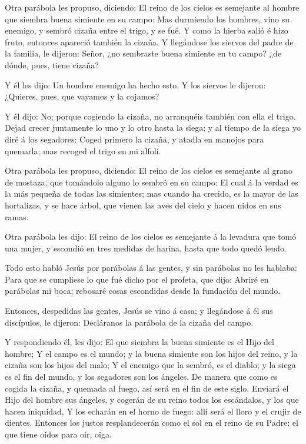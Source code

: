  Otra parábola les propuso, diciendo: El reino de los
cielos es semejante al hombre que siembra buena simiente en su campo:
 Mas durmiendo los hombres, vino su enemigo, y sembró
cizaña entre el trigo, y se fué.  Y como la hierba salió é
hizo fruto, entonces apareció también la cizaña.  Y
llegándose los siervos del padre de la familia, le dijeron: Señor, ¿no
sembraste buena simiente en tu campo? ¿de dónde, pues, tiene cizaña?

 Y él les dijo: Un hombre enemigo ha hecho esto. Y los
siervos le dijeron: ¿Quieres, pues, que vayamos y la cojamos?

 Y él dijo: No; porque cogiendo la cizaña, no arranquéis
también con ella el trigo.  Dejad crecer juntamente lo uno
y lo otro hasta la siega; y al tiempo de la siega yo diré á los
segadores: Coged primero la cizaña, y atadla en manojos para quemarla;
mas recoged el trigo en mi alfolí.

 Otra parábola les propuso, diciendo: El reino de los
cielos es semejante al grano de mostaza, que tomándolo alguno lo sembró
en su campo:  El cual á la verdad es la más pequeña de
todas las simientes; mas cuando ha crecido, es la mayor de las
hortalizas, y se hace árbol, que vienen las aves del cielo y hacen nidos
en sus ramas.

 Otra parábola les dijo: El reino de los cielos es
semejante á la levadura que tomó una mujer, y escondió en tres medidas
de harina, hasta que todo quedó leudo.

 Todo esto habló Jesús por parábolas á las gentes, y sin
parábolas no les hablaba:  Para que se cumpliese lo que fué
dicho por el profeta, que dijo: Abriré en parábolas mi boca; rebosaré
cosas escondidas desde la fundación del mundo.

 Entonces, despedidas las gentes, Jesús se vino á casa; y
llegándose á él sus discípulos, le dijeron: Decláranos la parábola de la
cizaña del campo.

 Y respondiendo él, les dijo: El que siembra la buena
simiente es el Hijo del hombre;  Y el campo es el mundo; y
la buena simiente son los hijos del reino, y la cizaña son los hijos del
malo;  Y el enemigo que la sembró, es el diablo; y la siega
es el fin del mundo, y los segadores son los ángeles.  De
manera que como es cogida la cizaña, y quemada al fuego, así será en el
fin de este siglo.  Enviará el Hijo del hombre sus ángeles,
y cogerán de su reino todos los escándalos, y los que hacen iniquidad,
 Y los echarán en el horno de fuego: allí será el lloro y
el crujir de dientes.  Entonces los justos resplandecerán
como el sol en el reino de su Padre: el que tiene oídos para oir, oiga.

